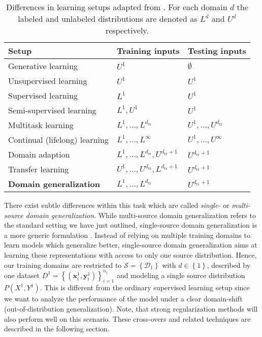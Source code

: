 \begin{table}[t]
    \centering
    \begin{tabular}{lll}
    \toprule
    \textbf{Setup} & \textbf{Training inputs}  & \textbf{Testing inputs} \\
    \midrule
        Generative learning & $U^1$ & $\emptyset$ \\ 
        Unsupervised learning & $U^1$ & $U^1$  \\ 
        Supervised learning & $L^1$ & $U^1$ \\ 
        Semi-supervised learning & $L^{1}, U^{1}$ & $U^1$ \\ 
        Multitask learning & $L^{1}, \ldots, L^{d_{\mathrm{tr}}}$ & $U^{1}, \ldots, U^{d_{\mathrm{tr}}}$ \\ 
        Continual (lifelong) learning & $L^{1}, \ldots, L^{\infty}$ & $U^{1}, \ldots, U^{\infty}$ \\ 
        Domain adaption & $L^{1}, \ldots, L^{d_{\mathrm{tr}}}, U^{d_{\mathrm{tr}}+1}$ & $U^{d_{\mathrm{tr}}+1}$ \\ 
        Transfer learning & $U^{1}, \ldots, U^{d_{\mathrm{tr}}}, L^{d_{\mathrm{tr}}+1}$ & $U^{d_{\mathrm{tr}}+1}$ \\ 
        \textbf{Domain generalization} & $L^{1}, \ldots, L^{d_{\mathrm{tr}}}$ & $U^{d_{\mathrm{tr}}+1}$ \\ 
    \bottomrule
    \end{tabular}
    \caption[Differences in learning setups]{Differences in learning setups adapted from \citet{gulrajani2020search}. For each domain $d$ the labeled and unlabeled distributions are denoted as $L^d$ and $U^d$ respectively.}
    \label{tab:learning_setups}
\end{table}

There exist subtle differences within this task which are called \emph{single-} or \emph{multi-source domain generalization}. While multi-source domain generalization refers to the standard setting we have just outlined, single-source domain generalization is a more generic formulation \citep{zunino2020explainable}. Instead of relying on multiple training domains to learn models which generalize better, single-source domain generalization aims at learning these representations with access to only one source distribution. Hence, our training domains are restricted to $\mathcal{S} = \left\{\mathcal{D}_{1}\right\}$ with $d \in\left\{1\right\}$, described by one dataset $D^{1}=\left\{\left(\mathbf{x}_{i}^{1}, \mathbf{y}_{i}^{1}\right)\right\}_{i=1}^{n_{1}}$ and modeling a single source distribution $P\left(X^{1}, Y^{1}\right)$. This is different from the ordinary supervised learning setup since we want to analyze the performance of the model under a clear domain-shift (\ie out-of-distribution generalization). Note, that strong regularization methods will also perform well on this scenario. These cross-overs and related techniques are described in the following section.

